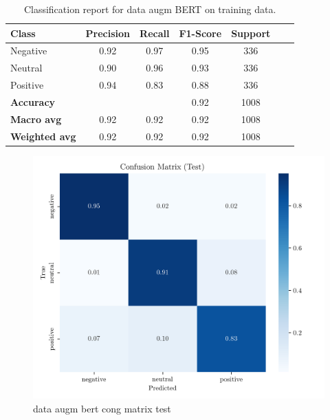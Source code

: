 \documentclass[conference]{IEEEtran}
\begin{document}
\begin{table}[H]
\centering
\caption{Classification report for data augm BERT on training data.}
\label{cr_augmbert_train}
\begin{tabular}{lcccccc}
\toprule
\textbf{Class} & \textbf{Precision} & \textbf{Recall} & \textbf{F1-Score} & \textbf{Support} \\
\midrule
Negative & 0.92 & 0.97 & 0.95 & 336 \\
Neutral & 0.90 & 0.96 & 0.93 & 336 \\
Positive & 0.94 & 0.83 & 0.88 & 336 \\
\midrule
\textbf{Accuracy} &  &  & 0.92 & 1008 \\
\textbf{Macro avg} & 0.92 & 0.92 & 0.92 & 1008 \\
\textbf{Weighted avg} & 0.92 & 0.92 & 0.92 & 1008 \\
\bottomrule
\end{tabular}
\end{table}

\begin{figure}[H]
    \centering
    \includegraphics[width=1\linewidth]{assets/dataaugmented_bert_confusion_matrix_Test.png}
    \caption{data augm bert cong matrix test}
    \label{fig:dataaugmented_bert_confusion_matrix_Test}
\end{figure}
\end{document}
